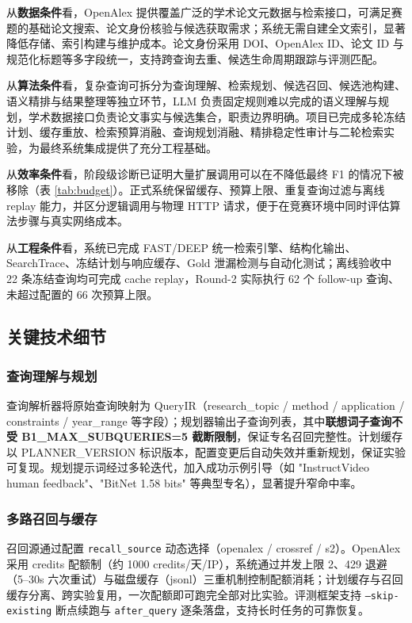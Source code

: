 \documentclass[11pt,a4paper,fontset=macnew]{ctexart}
\begin{document}
从\textbf{数据条件}看，OpenAlex 提供覆盖广泛的学术论文元数据与检索接口，可满足赛题的基础论文搜索、论文身份核验与候选获取需求；系统无需自建全文索引，显著降低存储、索引构建与维护成本。论文身份采用 DOI、OpenAlex ID、论文 ID 与规范化标题等多字段统一，支持跨查询去重、候选生命周期跟踪与评测匹配。

从\textbf{算法条件}看，复杂查询可拆分为查询理解、检索规划、候选召回、候选池构建、语义精排与结果整理等独立环节，LLM 负责固定规则难以完成的语义理解与规划，学术数据接口负责论文事实与候选集合，职责边界明确。项目已完成多轮冻结计划、缓存重放、检索预算消融、查询规划消融、精排稳定性审计与二轮检索实验，为最终系统集成提供了充分工程基础。

从\textbf{效率条件}看，阶段级诊断已证明大量扩展调用可以在不降低最终 F1 的情况下被移除（表 \ref{tab:budget}）。正式系统保留缓存、预算上限、重复查询过滤与离线 replay 能力，并区分逻辑调用与物理 HTTP 请求，便于在竞赛环境中同时评估算法步骤与真实网络成本。

从\textbf{工程条件}看，系统已完成 FAST/DEEP 统一检索引擎、结构化输出、SearchTrace、冻结计划与响应缓存、Gold 泄漏检测与自动化测试；离线验收中 22 条冻结查询均可完成 cache replay，Round-2 实际执行 62 个 follow-up 查询、未超过配置的 66 次预算上限。

\subsection{关键技术细节}
\label{sec:techdetail}

\subsubsection{查询理解与规划}
查询解析器将原始查询映射为 QueryIR（research\_topic / method / application / constraints / year\_range 等字段）；规划器输出子查询列表，其中\textbf{联想词子查询不受 B1\_MAX\_SUBQUERIES=5 截断限制}，保证专名召回完整性。计划缓存以 PLANNER\_VERSION 标识版本，配置变更后自动失效并重新规划，保证实验可复现。规划提示词经过多轮迭代，加入成功示例引导（如 "InstructVideo human feedback"、"BitNet 1.58 bits" 等典型专名），显著提升窄命中率。

\subsubsection{多路召回与缓存}
召回源通过配置 \texttt{recall\_source} 动态选择（openalex / crossref / s2）。OpenAlex 采用 credits 配额制（约 1000 credits/天/IP），系统通过并发上限 2、429 退避（5--30s 六次重试）与磁盘缓存（jsonl）三重机制控制配额消耗；计划缓存与召回缓存分离、跨实验复用，一次配额即可跑完全部对比实验。评测框架支持 \texttt{--skip-existing} 断点续跑与 \texttt{after\_query} 逐条落盘，支持长时任务的可靠恢复。
\end{document}
